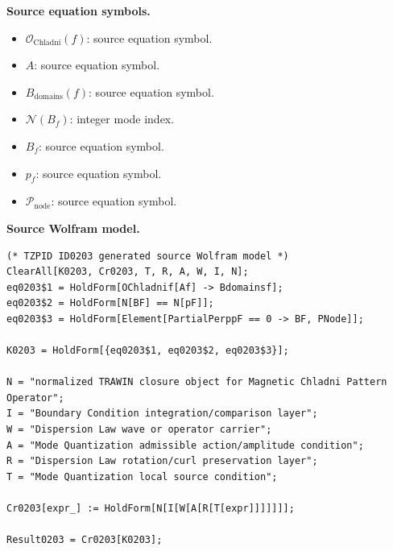 \begin{minipage}[t]{0.49\linewidth}
\begingroup
\small
\raggedright
\textbf{Source equation symbols.}\par
\begin{itemize}[leftmargin=1.35em,itemsep=1pt,topsep=1pt,parsep=0pt]
    \item $\mathcal{O}_{\mathrm{Chladni}}(f)$: source equation symbol.
    \item $A$: source equation symbol.
    \item $B_{\mathrm{domains}}(f)$: source equation symbol.
    \item $\mathcal{N}(B_f)$: integer mode index.
    \item $B_f$: source equation symbol.
    \item $p_f$: source equation symbol.
    \item $\mathcal{P}_{\mathrm{node}}$: source equation symbol.
\end{itemize}
\endgroup
\end{minipage}\hfill
\begin{minipage}[t]{0.47\linewidth}
\begingroup
\scriptsize
\raggedright
\textbf{Source Wolfram model.}\par
\begin{Verbatim}[fontsize=\tiny,breaklines=true,breakanywhere=true]
(* TZPID ID0203 generated source Wolfram model *)
ClearAll[K0203, Cr0203, T, R, A, W, I, N];
eq0203$1 = HoldForm[OChladnif[Af] -> Bdomainsf];
eq0203$2 = HoldForm[N[BF] == N[pF]];
eq0203$3 = HoldForm[Element[PartialPerppF == 0 -> BF, PNode]];

K0203 = HoldForm[{eq0203$1, eq0203$2, eq0203$3}];

N = "normalized TRAWIN closure object for Magnetic Chladni Pattern Operator";
I = "Boundary Condition integration/comparison layer";
W = "Dispersion Law wave or operator carrier";
A = "Mode Quantization admissible action/amplitude condition";
R = "Dispersion Law rotation/curl preservation layer";
T = "Mode Quantization local source condition";

Cr0203[expr_] := HoldForm[N[I[W[A[R[T[expr]]]]]]];

Result0203 = Cr0203[K0203];
\end{Verbatim}
\endgroup
\end{minipage}

